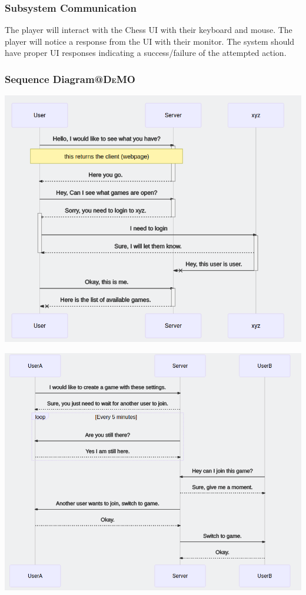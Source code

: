 \documentclass[11pt]{article}
\begin{document}
\subsubsection{Subsystem Communication}
\label{sec:org48815fc}
The player will interact with the Chess UI with their keyboard and
mouse. The player will notice a response from the UI with their
monitor. The system should have proper UI responses indicating a
success/failure of the attempted action.
\subsubsection{Sequence Diagram\hfill{}\textsc{@DeMO}}
\label{sec:orgd796285}
\begin{center}
\includegraphics[width=.9\linewidth]{diagrams/out/Sequence1.png}
\end{center}
\begin{center}
\includegraphics[width=.9\linewidth]{diagrams/out/Sequence2.png}
\end{center}
\end{document}
